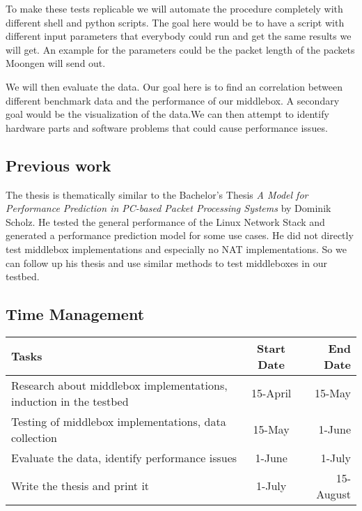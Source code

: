 \documentclass[NET,a4,12pt,ngerman]{netforms}
\begin{document}
To make these tests replicable we will automate the procedure completely with different shell and python scripts. The goal here would be to have a script with different input parameters that everybody could run and get the same results we will get. An example for the parameters could be the packet length of the packets Moongen will send out. 

We will then evaluate the data. Our goal here is to find an correlation between different benchmark data and the performance of our middlebox. A secondary goal would be the visualization of the data.We can then attempt to identify hardware parts and software problems that could cause performance issues. 


\subsection*{Previous work}

The thesis is thematically similar to the Bachelor's Thesis \emph{A Model for Performance Prediction
in PC-based Packet Processing Systems} \cite{WORK:1} by
Dominik Scholz. He tested the general performance of the Linux Network Stack and generated a performance prediction model for some use cases. 
He did not directly test middlebox implementations and especially no NAT implementations. So we can follow up his thesis and use similar methods to test middleboxes in our testbed. 


\subsection*{Time Management}
 \begin{tabular}{| l | c | r |}
 	\hline 
 	\textbf{Tasks} & \textbf{Start Date} & \textbf{End Date}  \\ \hline
	Research about middlebox implementations, induction in the testbed & 15-April & 15-May \\ \hline
	Testing of middlebox implementations, data collection & 15-May & 1-June \\ \hline
	Evaluate the data, identify performance issues & 1-June & 1-July \\ \hline
	Write the thesis and print it & 1-July & 15-August \\ 
	\hline
 \end{tabular}




\end{document}
